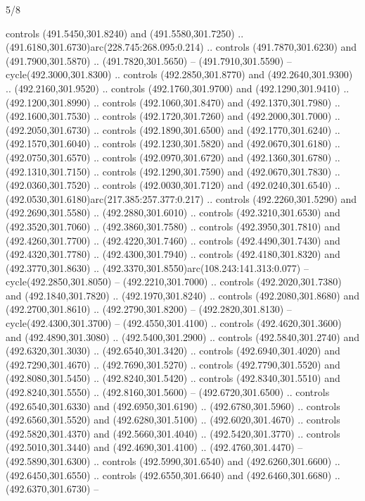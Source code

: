 \begin{flagdescription}{5/8}
\begin{scope}[xshift=0.5\flaglength,yshift=0.5\flagwidth,scale=\flagwidth/475.63]
\begin{scope}[y=0.8pt, x=0.8pt, yscale=-1, xscale=1,shift={(-450,-300)}]
\begin{scope}[cm={{1.0,0.0,0.0,1.0,(-0.0002,0.12556)}},cm={{1.0,0.0,0.0,1.0,(0.00179,0.0)}}]
\begin{scope}[cm={{1.11592,0.0,0.0,1.11592,(-106.89933,-41.77764)}}]
\begin{scope}[draw=black,fill=cfff]
\begin{scope}[fill=black]
  controls (491.5450,301.8240) and (491.5580,301.7250) ..
  (491.6180,301.6730)arc(228.745:268.095:0.214) .. controls (491.7870,301.6230)
  and (491.7900,301.5870) .. (491.7820,301.5650) -- (491.7910,301.5590) --
  cycle(492.3000,301.8300) .. controls (492.2850,301.8770) and
  (492.2640,301.9300) .. (492.2160,301.9520) .. controls (492.1760,301.9700) and
  (492.1290,301.9410) .. (492.1200,301.8990) .. controls (492.1060,301.8470) and
  (492.1370,301.7980) .. (492.1600,301.7530) .. controls (492.1720,301.7260) and
  (492.2000,301.7000) .. (492.2050,301.6730) .. controls (492.1890,301.6500) and
  (492.1770,301.6240) .. (492.1570,301.6040) .. controls (492.1230,301.5820) and
  (492.0670,301.6180) .. (492.0750,301.6570) .. controls (492.0970,301.6720) and
  (492.1360,301.6780) .. (492.1310,301.7150) .. controls (492.1290,301.7590) and
  (492.0670,301.7830) .. (492.0360,301.7520) .. controls (492.0030,301.7120) and
  (492.0240,301.6540) .. (492.0530,301.6180)arc(217.385:257.377:0.217) ..
  controls (492.2260,301.5290) and (492.2690,301.5580) .. (492.2880,301.6010) ..
  controls (492.3210,301.6530) and (492.3520,301.7060) .. (492.3860,301.7580) ..
  controls (492.3950,301.7810) and (492.4260,301.7700) .. (492.4220,301.7460) ..
  controls (492.4490,301.7430) and (492.4320,301.7780) .. (492.4300,301.7940) ..
  controls (492.4180,301.8320) and (492.3770,301.8630) ..
  (492.3370,301.8550)arc(108.243:141.313:0.077) -- cycle(492.2850,301.8050) --
  (492.2210,301.7000) .. controls (492.2020,301.7380) and (492.1840,301.7820) ..
  (492.1970,301.8240) .. controls (492.2080,301.8680) and (492.2700,301.8610) ..
  (492.2790,301.8200) -- (492.2820,301.8130) -- cycle(492.4300,301.3700) --
  (492.4550,301.4100) .. controls (492.4620,301.3600) and (492.4890,301.3080) ..
  (492.5400,301.2900) .. controls (492.5840,301.2740) and (492.6320,301.3030) ..
  (492.6540,301.3420) .. controls (492.6940,301.4020) and (492.7290,301.4670) ..
  (492.7690,301.5270) .. controls (492.7790,301.5520) and (492.8080,301.5450) ..
  (492.8240,301.5420) .. controls (492.8340,301.5510) and (492.8240,301.5550) ..
  (492.8160,301.5600) -- (492.6720,301.6500) .. controls (492.6540,301.6330) and
  (492.6950,301.6190) .. (492.6780,301.5960) .. controls (492.6560,301.5520) and
  (492.6280,301.5100) .. (492.6020,301.4670) .. controls (492.5820,301.4370) and
  (492.5660,301.4040) .. (492.5420,301.3770) .. controls (492.5010,301.3440) and
  (492.4690,301.4100) .. (492.4760,301.4470) -- (492.5890,301.6300) .. controls
  (492.5990,301.6540) and (492.6260,301.6600) .. (492.6450,301.6550) .. controls
  (492.6550,301.6640) and (492.6460,301.6680) .. (492.6370,301.6730) --

\end{scope}
\end{scope}
\end{scope}
\end{scope}
\end{scope}
\end{scope}
\end{flagdescription}
